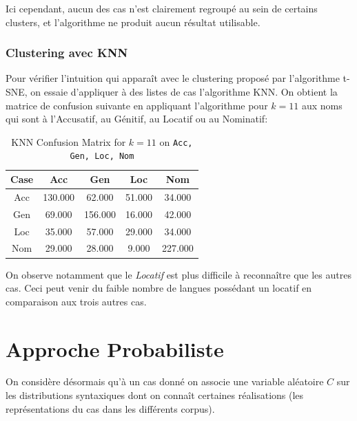 \documentclass{cours}
\begin{document}
Ici cependant, aucun des cas n'est clairement regroupé au sein de certains clusters, et l'algorithme ne produit aucun résultat utilisable.


\subsubsection{Clustering avec KNN}\label{subsub:knn}
Pour vérifier l'intuition qui apparaît avec le clustering proposé par l'algorithme t-SNE, on essaie d'appliquer à des listes de cas l'algorithme KNN.
On obtient la matrice de confusion suivante en appliquant l'algorithme pour $k = 11$ aux noms qui sont à l'Accusatif, au Génitif, au Locatif ou au Nominatif:
\begin{table}[H]
	\centering
	\begin{tabular}{ccccc}
		Case & Acc & Gen & Loc & Nom\\
		\midrule
		Acc & 130.000 & 62.000 & 51.000 & 34.000\\
		Gen & 69.000 & 156.000 & 16.000 & 42.000\\
		Loc & 35.000 & 57.000 & 29.000 & 34.000\\
		Nom & 29.000 & 28.000 & 9.000 & 227.000\\
	\end{tabular}
	\caption{KNN Confusion Matrix for $k = 11$ on \texttt{Acc, Gen, Loc, Nom}}
\end{table}

On observe notamment que le \emph{Locatif} est plus difficile à reconnaître que les autres cas. Ceci peut venir du faible nombre de langues possédant un locatif en comparaison aux trois autres cas.

\newpage
\section{Approche Probabiliste}\label{sec:probas}
On considère désormais qu'à un cas donné on associe une variable aléatoire $C$ sur les distributions syntaxiques dont on connaît certaines réalisations (les représentations du cas dans les différents corpus).
\end{document}
